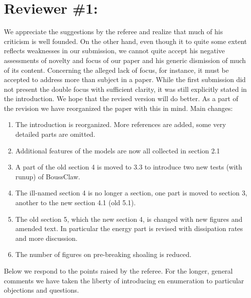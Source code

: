 \documentclass[11pt]{article}
\begin{document}
\newcommand{\refpoint}[1]{\ \vspace{0.3cm}\\ {\em #1}\  \vspace{0.3cm}\\ }
\newcommand{\refit}[1]{\em #1}
\newcommand{\todo}[1]{\ \\ {\bf To do: #1}\\}
\section*{Reviewer \#1:} 
We appreciate the suggestions by the referee and realize that much of his criticism is 
well founded. On the other hand, even though it to quite some extent reflects weaknesses in our 
submission, we cannot quite accept his negative assessments of novelty and focus of our paper 
and his generic dismission of much of its content.  
Concerning the alleged lack of focus, for instance, it must be accepted to address more than 
subject in a paper. While the first submission did not present the double focus with sufficient clarity, it was
still explicitly stated in the introduction. We hope that the revised version will do better.  As a part of the revision we have reorganized
the paper with this in mind. Main changes: 
\begin{enumerate}
\item The introduction is reorganized. More references are added, some very detailed parts are omitted.
\item Additional features of the models are now all collected in section 2.1
\item A part of the old section 4 is moved to 3.3 to introduce two new tests (with runup) of BoussClaw.
\item The ill-named section 4 is no longer a section, one part is moved to section 3, another to the new section 4.1 (old 5.1). 
\item The old section 5, which the new section 4, is changed with new figures and amended text.
      In particular the energy part is revised with dissipation rates and more discussion.
\item The number of figures on pre-breaking shoaling is reduced. 
\end{enumerate}
Below we respond to the points raised by the referee. For the longer, general comments we have taken the liberty of
introducing en enumeration to particular objections and questions.
\end{document}
